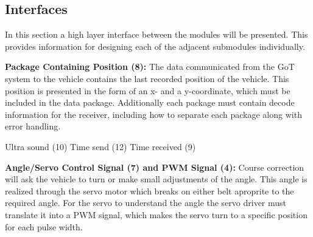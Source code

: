 
\subsection{Interfaces}
In this section a high layer interface between the modules will be presented. This provides information for designing each of the adjacent submodules individually.

\textbf{Package Containing Position (8):}
The data communicated from the GoT system to the vehicle contains the last recorded position of the vehicle. This position is presented in the form of an x- and a y-coordinate, which must be included in the data package. Additionally each package must contain decode information for the receiver, including how to separate each package along with error handling.

Ultra sound (10)
Time send (12)
Time received (9)

\textbf{Angle/Servo Control Signal (7) and PWM Signal (4):}
Course correction will ask the vehicle to turn or make small adjustments of the angle. This angle is realized through the servo motor which breaks on either belt aproprite to the required angle. For the servo to understand the angle the servo driver must translate it into a PWM signal, which makes the servo turn to a specific position for each pulse width.


